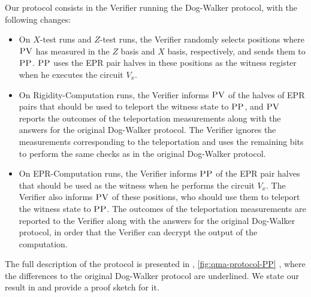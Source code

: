 \documentclass{toc}
\newcommand{\pv}{\textsc{PV}}
\newcommand{\pp}{\textsc{PP}}
\begin{document}
%
%
Our protocol consists in the Verifier running the Dog-Walker protocol,
  with the following changes:
  \begin{itemize}
  \item %
        On $X$-test runs 
        and $Z$-test runs, %
the Verifier randomly selects  positions where
$\pv$ has measured in the $Z$ basis %
and $X$ basis, respectively, %
and sends them to $\pp$. $\pp$ uses the EPR pair halves in these positions as the witness register when he executes the circuit $V_x$.
    \item On Rigidity-Computation runs, the Verifier
      informs $\pv$ of the halves of EPR pairs that should be used to teleport the witness
      state to $\pp$, and $\pv$ reports the outcomes of the teleportation
      measurements along with the answers for the original Dog-Walker protocol. The Verifier ignores the measurements corresponding to the teleportation and uses the remaining bits to perform the same checks as in the original Dog-Walker protocol.
      \item On EPR-Computation runs, the Verifier informs $\pp$ of the
      EPR pair halves that should be used as the witness when he performs the circuit $V_x$.  
      The Verifier
      also informs $\pv$ of these positions, who should use them to teleport the witness
      state to $\pp$.  The outcomes of the teleportation      measurements are reported to the Verifier along with the answers for the original Dog-Walker protocol, in order that the Verifier can decrypt the output of the computation.
  \end{itemize}

The full description of the protocol is presented in , \ref{fig:qma-protocol-PP} , where the differences to the original Dog-Walker protocol are underlined. We state our result in  and provide a proof sketch for it. 
\end{document}
